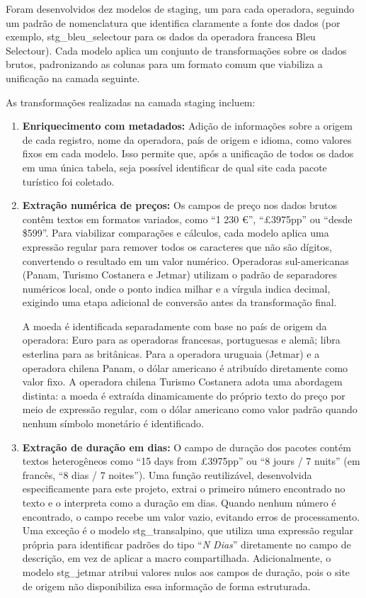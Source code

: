 Foram desenvolvidos dez modelos de staging, um para cada operadora, seguindo um padrão
de nomenclatura que identifica claramente a fonte dos dados (por exemplo,
stg\_bleu\_selectour para os dados da operadora francesa Bleu Selectour). Cada
modelo aplica um conjunto de transformações sobre os dados brutos, padronizando as
colunas para um formato comum que viabiliza a unificação na camada seguinte.

As transformações realizadas na camada staging incluem:

\begin{enumerate}
    \item \textbf{Enriquecimento com metadados:} Adição de informações sobre a origem
    de cada registro, nome da operadora, país de origem e idioma, como valores fixos em
    cada modelo. Isso permite que, após a unificação de todos os dados em uma única
    tabela, seja possível identificar de qual site cada pacote turístico foi coletado.

    \item \textbf{Extração numérica de preços:} Os campos de preço nos dados brutos
    contêm textos em formatos variados, como ``1 230 €'', ``£3975pp'' ou
    ``desde \$599''. Para viabilizar comparações e cálculos, cada modelo aplica uma
    expressão regular para remover todos os caracteres que não são dígitos, convertendo
    o resultado em um valor numérico. Operadoras sul-americanas (Panam, Turismo
    Costanera e Jetmar) utilizam o padrão de separadores numéricos local, onde o ponto
    indica milhar e a vírgula indica decimal, exigindo uma etapa adicional de conversão
    antes da transformação final.

    A moeda é identificada separadamente com base no país de origem da operadora: Euro
    para as operadoras francesas, portuguesas e alemã; libra esterlina para as
    britânicas. Para a operadora uruguaia (Jetmar) e a operadora chilena Panam, o
    dólar americano é atribuído diretamente como valor fixo. A operadora chilena Turismo
    Costanera adota uma abordagem distinta: a moeda é extraída dinamicamente do próprio
    texto do preço por meio de expressão regular, com o dólar americano como valor
    padrão quando nenhum símbolo monetário é identificado.

    \item \textbf{Extração de duração em dias:} O campo de duração dos pacotes contém
    textos heterogêneos como ``15 days from £3975pp'' ou ``8 jours / 7 nuits'' (em
    francês, ``8 dias / 7 noites''). Uma função reutilizável, desenvolvida
    especificamente para este projeto, extrai o primeiro número encontrado no texto e o
    interpreta como a duração em dias. Quando nenhum número é encontrado, o campo
    recebe um valor vazio, evitando erros de processamento. Uma exceção é o modelo
    stg\_transalpino, que utiliza uma expressão regular própria para
    identificar padrões do tipo ``\textit{N Dias}'' diretamente no campo de descrição,
    em vez de aplicar a macro compartilhada. Adicionalmente, o modelo
    stg\_jetmar atribui valores nulos aos campos de duração, pois o site de
    origem não disponibiliza essa informação de forma estruturada.


\end{enumerate}
